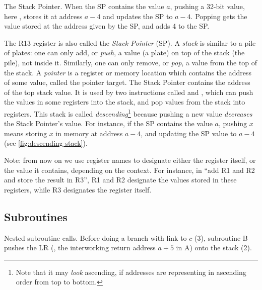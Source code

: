 \begin{Figure}
  

  \caption{The Stack Pointer. When the SP contains the value $a$, pushing a
    32-bit value, here , stores it at address $a-4$ and updates
    the SP to $a-4$. Popping gets the value stored at the address given by the
    SP, and adds 4 to the SP.}\label{fig:descending-stack}
\end{Figure}

The R13 register is also called the {\em Stack Pointer} (SP). A {\em stack} is
similar to a pile of plates: one can only add, or {\em push}, a value (a plate)
on top of the stack (the pile), not inside it. Similarly, one can only remove,
or {\em pop}, a value from the top of the stack. A {\em pointer} is a register
or memory location which contains the address of some value, called the pointer
target. The Stack Pointer contains the address of the top stack value. It is
used by two instructions called  and , which can push the
values in some registers into the stack, and pop values from the stack into
registers. This stack is called {\em descending}\footnote{Note that it may {\em
look} ascending, if addresses are representing in ascending order from top to
bottom.} because pushing a new value {\em decreases} the Stack Pointer's value.
For instance, if the SP contains the value $a$, pushing $x$ means storing $x$
in memory at address $a-4$, and updating the SP value to $a-4$ (see
\cref{fig:descending-stack}).

Note: from now on we use register names to designate either the register
itself, or the value it contains, depending on the context. For instance, in
``add R1 and R2 and store the result in R3'', R1 and R2 designate the values
stored in these registers, while R3 designates the register itself.

\subsection{Subroutines}\label{subsection:subroutines}

\begin{Figure}
  

  \caption{Nested subroutine calls. Before doing a branch with link to $c$ (3),
  subroutine B pushes the LR (\ie, the interworking return address $a+5$ in A)
  onto the stack (2).}\label{fig:subroutine-calls}
\end{Figure}

